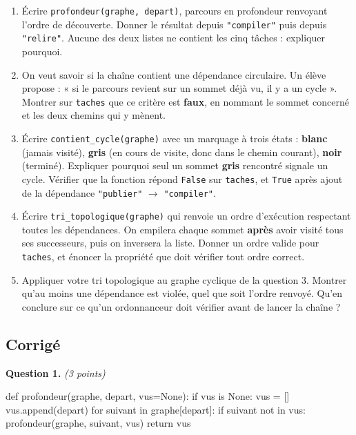 \begin{enumerate}
  \item Écrire \lstinline{profondeur(graphe, depart)}, parcours en profondeur
    renvoyant l'ordre de découverte. Donner le résultat depuis
    \lstinline{"compiler"} puis depuis \lstinline{"relire"}. Aucune des deux
    listes ne contient les cinq tâches : expliquer pourquoi.

  \item On veut savoir si la chaîne contient une dépendance circulaire. Un élève
    propose : « si le parcours revient sur un sommet déjà vu, il y a un cycle ».
    Montrer sur \lstinline{taches} que ce critère est \textbf{faux}, en nommant
    le sommet concerné et les deux chemins qui y mènent.

  \item Écrire \lstinline{contient_cycle(graphe)} avec un marquage à trois
    états : \textbf{blanc} (jamais visité), \textbf{gris} (en cours de visite,
    donc dans le chemin courant), \textbf{noir} (terminé). Expliquer pourquoi
    seul un sommet \textbf{gris} rencontré signale un cycle. Vérifier que la
    fonction répond \lstinline{False} sur \lstinline{taches}, et
    \lstinline{True} après ajout de la dépendance
    \lstinline{"publier"} $\rightarrow$ \lstinline{"compiler"}.

  \item Écrire \lstinline{tri_topologique(graphe)} qui renvoie un ordre
    d'exécution respectant toutes les dépendances. On empilera chaque sommet
    \textbf{après} avoir visité tous ses successeurs, puis on inversera la
    liste. Donner un ordre valide pour \lstinline{taches}, et énoncer la
    propriété que doit vérifier tout ordre correct.

  \item Appliquer votre tri topologique au graphe cyclique de la question 3.
    Montrer qu'au moins une dépendance est violée, quel que soit l'ordre
    renvoyé. Qu'en conclure sur ce qu'un ordonnanceur doit vérifier avant de
    lancer la chaîne ?
\end{enumerate}

\subsection*{Corrigé}

\textbf{Question 1.} \emph{(3 points)}

\begin{python}
def profondeur(graphe, depart, vus=None):
    if vus is None:
        vus = []
    vus.append(depart)
    for suivant in graphe[depart]:
        if suivant not in vus:
            profondeur(graphe, suivant, vus)
    return vus
\end{python}


